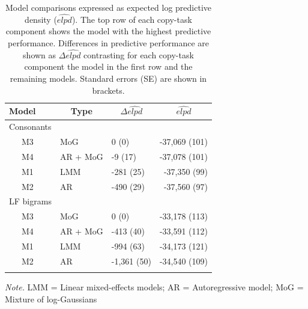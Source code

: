 \documentclass[
  english,
  man,mask,floatsintext]{apa7}
\begin{document}
\begin{table}[!ht]

\begin{center}
\begin{threeparttable}

\caption{\label{tab:modelcomparisons}Model comparisons expressed as expected log predictive density ($\widehat{elpd}$). The top row of each copy-task component shows the model with the highest predictive performance. Differences in predictive performance are shown as $\Delta\widehat{elpd}$ contrasting for each copy-task component the model in the first row and the remaining models. Standard errors (SE) are shown in brackets.}

\begin{tabular}{lllr}
\toprule
Model & \multicolumn{1}{c}{Type} & \multicolumn{1}{c}{$\Delta\widehat{elpd}$} & \multicolumn{1}{c}{$\widehat{elpd}$}\\
\midrule
Consonants &  &  & \\
\ \ \ M3 & MoG & 0 (0) & -37,069 (101)\\
\ \ \ M4 & AR + MoG & -9 (17) & -37,078 (101)\\
\ \ \ M1 & LMM & -281 (25) & -37,350 (99)\\
\ \ \ M2 & AR & -490 (29) & -37,560 (97)\\
LF bigrams &  &  & \\
\ \ \ M3 & MoG & 0 (0) & -33,178 (113)\\
\ \ \ M4 & AR + MoG & -413 (40) & -33,591 (112)\\
\ \ \ M1 & LMM & -994 (63) & -34,173 (121)\\
\ \ \ M2 & AR & -1,361 (50) & -34,540 (109)\\
\bottomrule
\addlinespace
\end{tabular}

\begin{tablenotes}[para]
\normalsize{\textit{Note.} LMM = Linear mixed-effects models; AR = Autoregressive model; MoG = Mixture of log-Gaussians}
\end{tablenotes}

\end{threeparttable}
\end{center}

\end{table}
\end{document}
